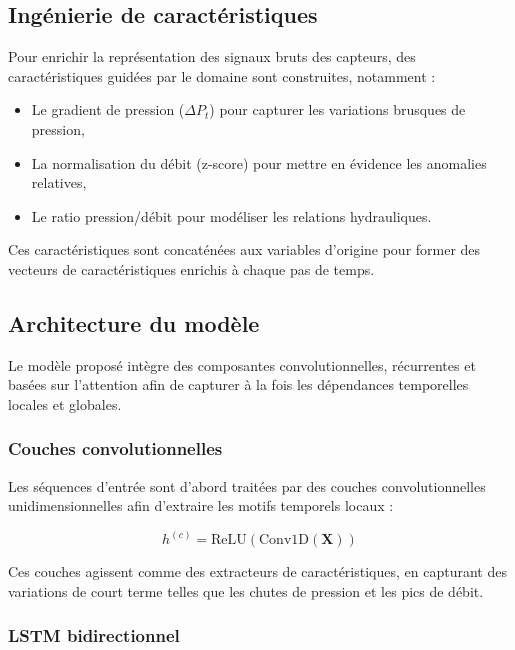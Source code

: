 \subsection{Ingénierie de caractéristiques}

Pour enrichir la représentation des signaux bruts des capteurs, des
caractéristiques guidées par le domaine sont construites, notamment :

\begin{itemize}
    \item Le gradient de pression ($\Delta P_t$) pour capturer les variations brusques de pression,
    \item La normalisation du débit (z-score) pour mettre en évidence les anomalies relatives,
    \item Le ratio pression/débit pour modéliser les relations hydrauliques.
\end{itemize}

Ces caractéristiques sont concaténées aux variables d'origine pour former des
vecteurs de caractéristiques enrichis à chaque pas de temps.

\subsection{Architecture du modèle}

Le modèle proposé intègre des composantes convolutionnelles, récurrentes et
basées sur l'attention afin de capturer à la fois les dépendances temporelles
locales et globales.

\subsubsection{Couches convolutionnelles}

Les séquences d'entrée sont d'abord traitées par des couches convolutionnelles
unidimensionnelles afin d'extraire les motifs temporels locaux :

\begin{equation}
h^{(c)} = \text{ReLU}(\text{Conv1D}(\mathbf{X}))
\end{equation}

Ces couches agissent comme des extracteurs de caractéristiques, en capturant des
variations de court terme telles que les chutes de pression et les pics de débit.

\subsubsection{LSTM bidirectionnel}

